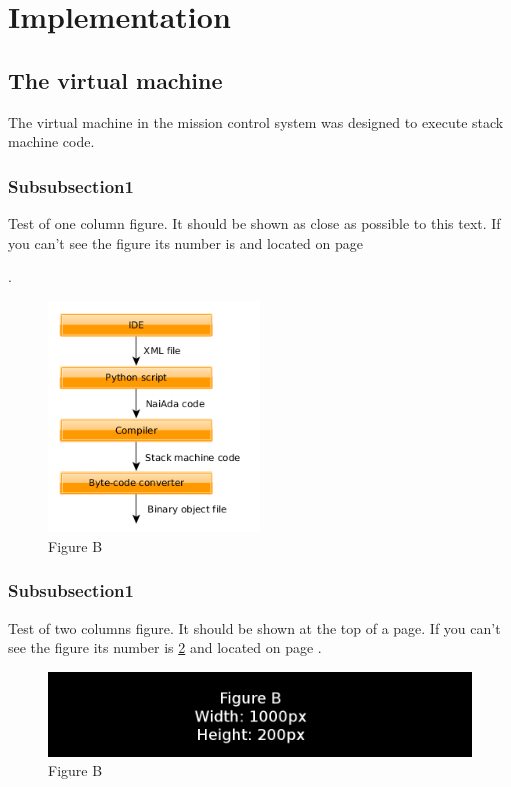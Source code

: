 \section{Implementation}\label{sec:implementation}


\subsection{The virtual machine}
The virtual machine in the mission control system was designed to execute stack machine code. 
\subsubsection{Subsubsection1}
Test of one column figure. It should be shown as close as possible to this
text. If you can't see the figure its number is 
and located on page 

\pageref{fig:another_column_figure}.
\begin{figure}[h]
    \includegraphics[width=0.5\textwidth]{./figure/figureMissionCreationToolchain.png}
    \caption{Figure B}
    \label{fig:another_column_figure}
\end{figure}

\subsubsection{Subsubsection1}
Test of two columns figure. It should be shown at the top of a page. If you
can't see the figure its number is \ref{fig:two_column_figure}
and located on page \pageref{fig:two_column_figure}.
\begin{figure}[t]
    \includegraphics[width=1.0\textwidth]{./figure/figureB.png}
    \caption{Figure B}
    \label{fig:two_column_figure}
\end{figure}
